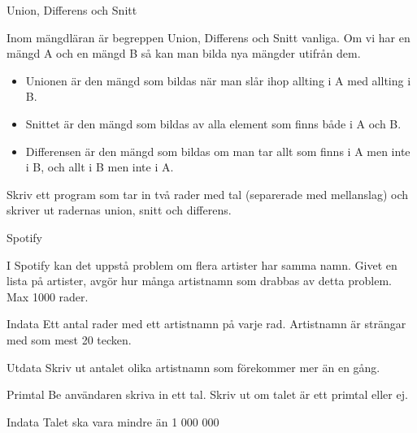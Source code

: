 \documentclass[10pt]{beamer}
\begin{document}
\begin{frame}{Union, Differens och Snitt}

Inom mängdläran är begreppen Union, Differens och Snitt vanliga. Om vi har en mängd A och en mängd B så kan man bilda nya mängder utifrån dem. 
\begin{itemize}
\item Unionen är den mängd som bildas när man slår ihop allting i A med allting i B. 
\item Snittet är den mängd som bildas av alla element som finns både i A och B. 
\item Differensen är den mängd som bildas om man tar allt som finns i A men inte i B, och allt i B men inte i A. 
\end{itemize}

Skriv ett program som tar in två rader med tal (separerade med mellanslag) och skriver ut radernas union, snitt och differens. 

\end{frame}




\begin{frame}{Spotify}

I Spotify kan det uppstå problem om flera artister har samma namn. Givet en lista på artister, avgör hur många artistnamn som drabbas av detta problem. Max 1000 rader.

\begin{exampleblock}{Indata}
Ett antal rader med ett artistnamn på varje rad. Artistnamn är strängar med som mest 20 tecken.
\end{exampleblock}

\begin{exampleblock}{Utdata}
Skriv ut antalet olika artistnamn som förekommer mer än en gång.
\end{exampleblock}

\end{frame}






\begin{frame}{Primtal}
Be användaren skriva in ett tal. Skriv ut om talet är ett primtal eller ej.

\begin{exampleblock}{Indata}
Talet ska vara mindre än 1 000 000
\end{exampleblock}
\end{frame}
\end{document}
